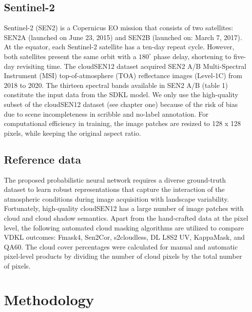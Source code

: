 \documentclass[a4paper, nobind]{templates/cdethesis}
\begin{document}
\subsection{Sentinel-2}

Sentinel-2 (SEN2) is a Copernicus EO mission that consists of two satellites: SEN2A (launched on June 23, 2015) and SEN2B (launched on: March 7, 2017). At the equator, each Sentinel-2 satellite has a ten-day repeat cycle. However, both satellites present the same orbit with a \(180^\circ\) phase delay, shortening to five-day revisiting time. The cloudSEN12 dataset acquired SEN2 A/B Multi-Spectral Instrument (MSI) top-of-atmosphere (TOA) reflectance images (Level-1C) from 2018 to 2020. The thirteen spectral bands available in SEN2 A/B (table 1) constitute the input data from the SDKL model. We only use the high-quality subset of the cloudSEN12 dataset (see chapter one) because of the risk of bias due to scene incompleteness in scribble and no-label annotation. For computational efficiency in training, the image patches are resized to 128 x 128 pixels, while keeping the original aspect ratio.

\subsection{Reference data} \label{section:ref_data}

The proposed probabilistic neural network requires a diverse ground-truth dataset to learn robust representations that capture the interaction of the atmospheric conditions during image acquisition with landscape variability. Fortunately, high-quality cloudSEN12 has a large number of image patches with cloud and cloud shadow semantics. Apart from the hand-crafted data at the pixel level, the following automated cloud masking algorithms are utilized to compare VDKL outcomes: Fmask4, Sen2Cor, s2cloudless, DL L8S2 UV, KappaMask, and QA60. The cloud cover percentages were calculated for manual and automatic pixel-level products by dividing the number of cloud pixels by the total number of pixels.

\hypertarget{methodology}{%
\section{Methodology}\label{methodology}}
\end{document}
